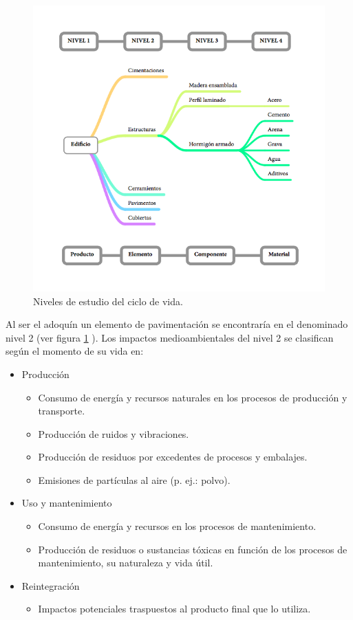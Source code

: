 \begin{figure}[!htb]
\centering
\includegraphics[width=15cm]{niveles_estudio_ciclo_vida.png}
\caption{Niveles de estudio del ciclo de vida.}
\label{fig:niveles_estudio_ciclo_vida}
\end{figure}

Al ser el adoquín un elemento de pavimentación se encontraría en el denominado nivel 2 (ver figura \ref{fig:niveles_estudio_ciclo_vida} ). Los impactos medioambientales del nivel 2 se clasifican según el momento de su vida en:

\begin{itemize}
  \item Producción
    \begin{itemize}
     \item Consumo de energía y recursos naturales en los procesos de producción y transporte.
     \item Producción de ruidos y vibraciones.
     \item Producción de residuos por excedentes de procesos y embalajes.
     \item Emisiones de partículas al aire (p. ej.: polvo).
    \end{itemize}
  \item Uso y mantenimiento
    \begin{itemize}
      \item Consumo de energía y recursos en los procesos de mantenimiento.
      \item Producción de residuos o sustancias tóxicas en función de los procesos de mantenimiento, su naturaleza y vida útil.
    \end{itemize}
  \item Reintegración
    \begin{itemize}
      \item Impactos potenciales traspuestos al producto final que lo utiliza.
    \end{itemize}
\end{itemize}

